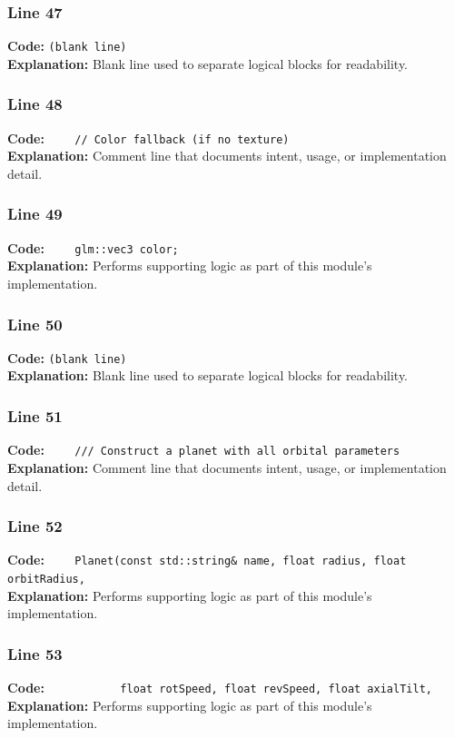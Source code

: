 \documentclass[11pt,a4paper]{article}
\begin{document}
\subsubsection*{Line 47}
\textbf{Code:} \texttt{(blank line)}\\
\textbf{Explanation:} Blank line used to separate logical blocks for readability.

\subsubsection*{Line 48}
\textbf{Code:} \verb|    // Color fallback (if no texture)|\\
\textbf{Explanation:} Comment line that documents intent, usage, or implementation detail.

\subsubsection*{Line 49}
\textbf{Code:} \verb|    glm::vec3 color;|\\
\textbf{Explanation:} Performs supporting logic as part of this module's implementation.

\subsubsection*{Line 50}
\textbf{Code:} \texttt{(blank line)}\\
\textbf{Explanation:} Blank line used to separate logical blocks for readability.

\subsubsection*{Line 51}
\textbf{Code:} \verb|    /// Construct a planet with all orbital parameters|\\
\textbf{Explanation:} Comment line that documents intent, usage, or implementation detail.

\subsubsection*{Line 52}
\textbf{Code:} \verb|    Planet(const std::string& name, float radius, float orbitRadius,|\\
\textbf{Explanation:} Performs supporting logic as part of this module's implementation.

\subsubsection*{Line 53}
\textbf{Code:} \verb|           float rotSpeed, float revSpeed, float axialTilt,|\\
\textbf{Explanation:} Performs supporting logic as part of this module's implementation.
\end{document}
